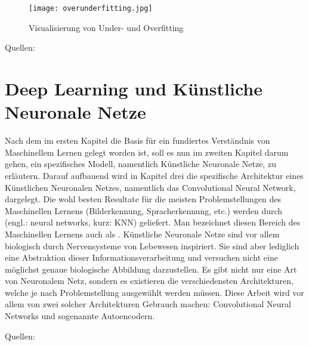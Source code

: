 \begin{figure}[h!]
  \centering
  \texttt{[image: overunderfitting.jpg]}
  \caption{Visualisierung von Under- und Overfitting}
\end{figure}
\para{}
Quellen: \cite{wiki:overfitting} \cite{Goodfellow-et-al-2016} \cite{book:hands-on}


\chapter{Deep Learning und Künstliche Neuronale Netze}
Nach dem im ersten Kapitel die Basis für ein fundiertes Verständnis von
Maschinellem Lernen gelegt worden ist, soll es nun im zweiten Kapitel darum
gehen, ein spezifisches Modell, namentlich Künstliche Neuronale Netze, zu
erläutern. Darauf aufbauend wird in Kapitel drei die spezifische Architektur
eines Künstlichen Neuronalen Netzes, namentlich das Convolutional Neural Network,
dargelegt.
\para{}
\bigskip
Die wohl besten Resultate für die meisten Problemstellungen des Maschinellen Lernens (Bilderkennung,
Spracherkennung, etc.) werden durch  (engl.:
neural networks, kurz: KNN) geliefert.
Man bezeichnet diesen Bereich des Maschinellen Lernens auch als .
\para{}
Künstliche Neuronale Netze sind vor allem biologisch durch Nervensysteme von
Lebewesen inspiriert.
Sie sind aber lediglich eine Abstraktion dieser Informationsverarbeitung und
versuchen nicht eine möglichst genaue biologische Abbildung darzustellen.
Es gibt nicht nur eine Art von Neuronalem Netz, sondern es existieren die
verschiedensten Architekturen, welche je nach Problemstellung ausgewählt werden
müssen. Diese Arbeit wird vor allem von zwei solcher Architekturen Gebrauch machen:
Convolutional Neural Networks und sogenannte Autoencodern.

\para{}
Quellen: \cite{book:hands-on}

